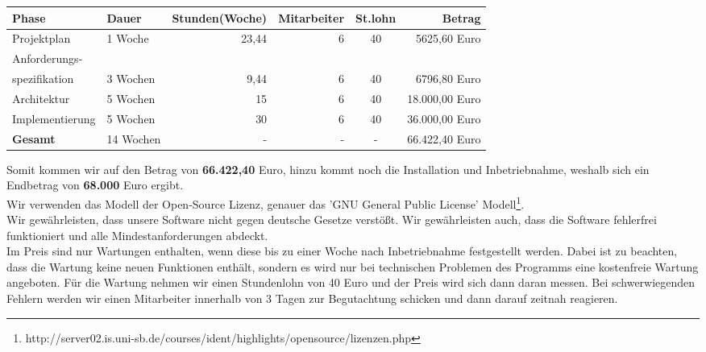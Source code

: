 \documentclass[fontsize=12pt,paper=a4,twoside]{scrartcl}
\begin{document}
\begin{table}[htbp]
\begin{tabular}{|p{3cm}||p{2cm}|r|r|c|r|}
\hline 
\textbf{Phase} & \textbf{Dauer} & \textbf{Stunden(Woche)} & \textbf{Mitarbeiter} & \textbf{St.lohn} & \textbf{Betrag} \\ \hline \hline
Projektplan & 1 Woche & 23,44 & 6 & 40 & 5625,60 Euro\\ \hline
Anforderungs- & & & & & \\ 
spezifikation & 3 Wochen & 9,44 & 6 & 40 & 6796,80 Euro\\ \hline
Architektur & 5 Wochen & 15 & 6 & 40 & 18.000,00 Euro\\ \hline
Implementierung & 5 Wochen& 30 & 6 & 40 & 36.000,00 Euro\\ \hline
\textbf{Gesamt} & 14 Wochen &- &- &- & 66.422,40 Euro \\ \hline
\end{tabular}
\end{table}
Somit kommen wir auf den Betrag von \textbf{66.422,40} Euro, hinzu kommt noch die Installation und Inbetriebnahme, weshalb sich ein Endbetrag von \textbf{68.000} Euro ergibt.\\
Wir verwenden das Modell der Open-Source Lizenz, genauer das 'GNU General Public License' Modell\footnote{http://server02.is.uni-sb.de/courses/ident/highlights/opensource/lizenzen.php}.\\
Wir gewährleisten, dass unsere Software nicht gegen deutsche Gesetze verstößt. Wir gewährleisten auch, dass die Software fehlerfrei funktioniert und alle Mindestanforderungen abdeckt.\\
Im Preis sind nur Wartungen enthalten, wenn diese bis zu einer Woche nach Inbetriebnahme festgestellt werden. Dabei ist zu beachten, dass die Wartung keine neuen Funktionen enthält, sondern es wird nur bei technischen Problemen des Programms eine kostenfreie Wartung angeboten. Für die Wartung nehmen wir einen Stundenlohn von 40 Euro und der Preis wird sich dann daran messen. Bei schwerwiegenden Fehlern werden wir einen Mitarbeiter innerhalb von 3 Tagen zur Begutachtung schicken und dann darauf zeitnah reagieren. 
\end{document}
